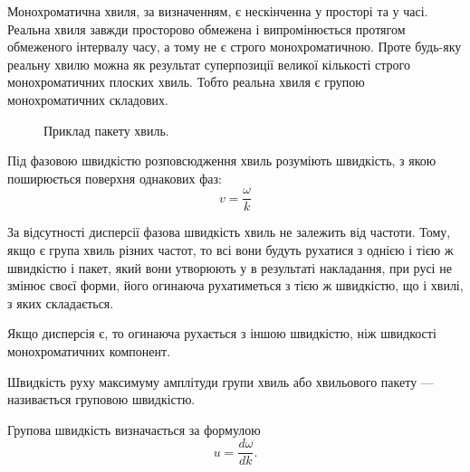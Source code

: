 Монохроматична хвиля, за визначенням, є нескінченна у просторі та у часі. Реальна хвиля завжди просторово обмежена і випромінюється протягом обмеженого інтервалу часу, а тому не є строго монохроматичною. Проте будь-яку реальну хвилю можна як результат суперпозиції великої кількості строго монохроматичних плоских хвиль. Тобто реальна хвиля є групою монохроматичних складових.

\begin{figure}[h!]\centering
	\caption{Приклад пакету хвиль.}
\end{figure}

Під фазовою швидкістю розповсюдження хвиль розуміють швидкість, з якою поширюється
поверхня однакових фаз:
\begin{equation}\label{eq:pahse_velocity}
	v = \frac{\omega}{k}
\end{equation}


За відсутності дисперсії фазова швидкість хвиль не залежить від частоти. Тому, якщо є група хвиль різних частот, то всі вони будуть рухатися з однією і тією ж швидкістю і пакет, який вони утворюють у
в результаті накладання, при русі не змінює своєї форми, його огинаюча рухатиметься з тією ж швидкістю, що і хвилі, з яких складається.

Якщо дисперсія є, то огинаюча рухається з іншою швидкістю, ніж швидкості монохроматичних компонент.

Швидкість руху максимуму амплітуди групи хвиль або хвильового пакету ---  називається груповою швидкістю.

%

Групова швидкість визначається за формулою
\begin{equation}\label{eq: group_velocity}
	u = \frac{d\omega}{dk}.
\end{equation}

